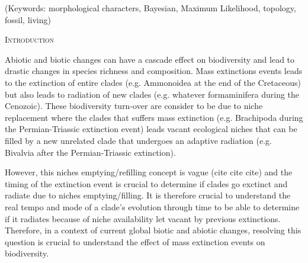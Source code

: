 \documentclass[12pt,letterpaper]{article}
\renewcommand{\section}[1]{%
\bigskip
\begin{center}
\begin{Large}
\normalfont\scshape #1
\medskip
\end{Large}
\end{center}}
\begin{document}
\noindent (Keywords: morphological characters, Bayesian, Maximum Likelihood, topology, fossil, living)\\

\vspace{1.5in}

\newpage 

%
%

\section{Introduction}



Abiotic and biotic changes can have a cascade effect on biodiversity and lead to drastic changes in species richness and composition. %
Mass extinctions events leads to the extinction of entire clades (e.g. Ammonoidea at the end of the Cretaceous) but also leads to radiation of new clades (e.g. whatever formaminifera \cite{Erwin1998344} during the Cenozoic).
These biodiversity turn-over are consider to be due to niche replacement where the clades that suffers mass extinction (e.g. Brachipoda during the Permian-Triassic extinction event) leads vacant ecological niches that can be filled by a new unrelated clade that undergoes an adaptive radiation (e.g. Bivalvia after the Permian-Triassic extinction).  

However, this niches emptying/refilling concept is vague (cite cite cite) and the timing of the extinction event is crucial to determine if clades go exctinct and radiate due to niches emptying/filling.
It is therefore crucial to understand the real tempo and mode of a clade's evolution through time to be able to determine if it radiates because of niche availability let vacant by previous extinctions. Therefore, in a context of current global biotic and abiotic changes, resolving this question is crucial to understand the effect of mass extinction events on biodiversity.
\end{document}
